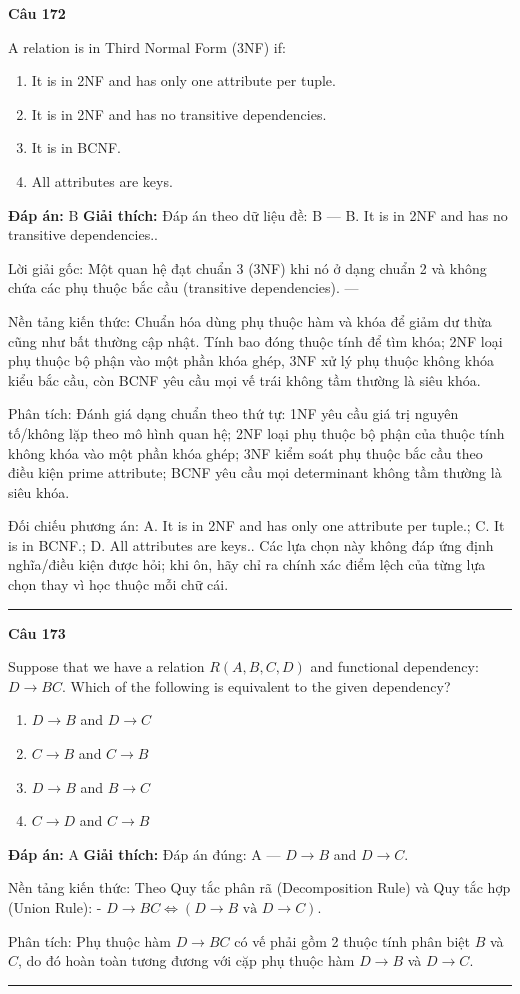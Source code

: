 \documentclass[11pt,a4paper]{article}
\newenvironment{question}[1]{%
  \par\vspace{1em}\noindent\textbf{\large Câu #1}\par\vspace{0.4em}
}{%
  \par\vspace{1em}\hrule\vspace{0.6em}
}
\newenvironment{choices}{%
  \begin{enumerate}[label=\textbf{\Alph*.},leftmargin=2.2em,itemsep=2pt,topsep=3pt]
}{%
  \end{enumerate}
}
\newcommand{\choice}{\item}
\begin{document}
\begin{question}{172}
A relation is in Third Normal Form (3NF) if:
\begin{choices}
\choice It is in 2NF and has only one attribute per tuple.
\choice It is in 2NF and has no transitive dependencies.
\choice It is in BCNF.
\choice All attributes are keys.
\end{choices}
\textbf{Đáp án:} B
\textbf{Giải thích:} Đáp án theo dữ liệu đề: B — B. It is in 2NF and has no transitive dependencies..

Lời giải gốc: Một quan hệ đạt chuẩn 3 (3NF) khi nó ở dạng chuẩn 2 và không chứa các phụ thuộc bắc cầu (transitive dependencies). ---

Nền tảng kiến thức: Chuẩn hóa dùng phụ thuộc hàm và khóa để giảm dư thừa cũng như bất thường cập nhật. Tính bao đóng thuộc tính để tìm khóa; 2NF loại phụ thuộc bộ phận vào một phần khóa ghép, 3NF xử lý phụ thuộc không khóa kiểu bắc cầu, còn BCNF yêu cầu mọi vế trái không tầm thường là siêu khóa.

Phân tích: Đánh giá dạng chuẩn theo thứ tự: 1NF yêu cầu giá trị nguyên tố/không lặp theo mô hình quan hệ; 2NF loại phụ thuộc bộ phận của thuộc tính không khóa vào một phần khóa ghép; 3NF kiểm soát phụ thuộc bắc cầu theo điều kiện prime attribute; BCNF yêu cầu mọi determinant không tầm thường là siêu khóa.

Đối chiếu phương án: A. It is in 2NF and has only one attribute per tuple.; C. It is in BCNF.; D. All attributes are keys.. Các lựa chọn này không đáp ứng định nghĩa/điều kiện được hỏi; khi ôn, hãy chỉ ra chính xác điểm lệch của từng lựa chọn thay vì học thuộc mỗi chữ cái.
\end{question}


\begin{question}{173}
Suppose that we have a relation \(R(A, B, C, D)\) and functional dependency: \(D \rightarrow BC\). Which of the following is equivalent to the given dependency?
\begin{choices}
\choice \(D \rightarrow B\) and \(D \rightarrow C\)
\choice \(C \rightarrow B\) and \(C \rightarrow B\)
\choice \(D \rightarrow B\) and \(B \rightarrow C\)
\choice \(C \rightarrow D\) and \(C \rightarrow B\)
\end{choices}
\textbf{Đáp án:} A
\textbf{Giải thích:} Đáp án đúng: A — $D \to B$ and $D \to C$.

Nền tảng kiến thức: Theo Quy tắc phân rã (Decomposition Rule) và Quy tắc hợp (Union Rule):
- $D \to BC \iff (D \to B \text{ và } D \to C)$.

Phân tích: Phụ thuộc hàm $D \to BC$ có vế phải gồm 2 thuộc tính phân biệt $B$ và $C$, do đó hoàn toàn tương đương với cặp phụ thuộc hàm $D \to B$ và $D \to C$.
\end{question}
\end{document}
